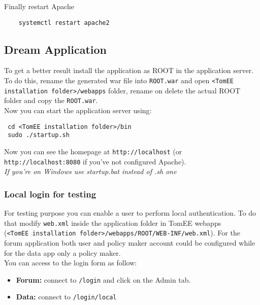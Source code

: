 Finally restart Apache
\begin{verbatim}
    systemctl restart apache2
\end{verbatim}


\subsection{Dream Application}
To get a better result install the application as ROOT in the application server. To do this, rename the generated war file into \texttt{ROOT.war} and open \texttt{<TomEE installation folder>/webapps} folder, rename on delete the actual ROOT folder and copy the \texttt{ROOT.war}.\\
Now you can start the application server using: 
\begin{verbatim}
 cd <TomEE installation folder>/bin
 sudo ./startup.sh
\end{verbatim}
Now you can see the homepage at \texttt{http://localhost} (or  \texttt{http://localhost:8080} if you've not configured Apache).\\
\textit{If you're on Windows use startup.bat instead of .sh one}

\subsubsection*{Local login for testing}
For testing purpose you can enable a user to perform local authentication. To do that modify \texttt{web.xml} inside the application folder in TomEE webapps \\(\texttt{<TomEE installation folder>/webapps/ROOT/WEB-INF/web.xml}). For the forum application both user and policy maker account could be configured while for the data app only a policy maker. \\
You can access to the login form as follow:
\begin{itemize}
    \item \textbf{Forum:} connect to \texttt{/login} and click on the Admin tab.
    \item \textbf{Data:} connect to \texttt{/login/local}
\end{itemize}

